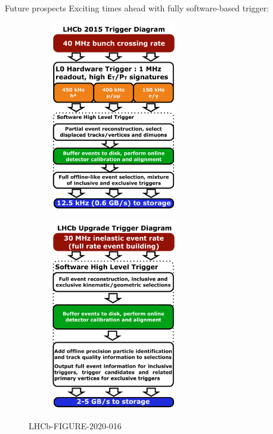 \documentclass[dvipsnames]{beamer}
\begin{document}
\begin{frame}{Future prospects}
  \vspace{0.3cm}
  {\Large Exciting times ahead with fully software-based trigger:}
  \begin{figure}[htb]
    \centering
    \begin{subfigure}{0.5\textwidth}
      \centering
      \includegraphics[width=0.6\textwidth]{Plots/LHCb_Run2_Trigger.pdf}
    \end{subfigure}%
    \begin{subfigure}{0.5\textwidth}
      \centering
      \includegraphics[width=0.6\textwidth]{Plots/LHCb_Run3_Trigger.pdf}
    \end{subfigure}
    \caption*{\tiny LHCb-FIGURE-2020-016}
  \end{figure}
\end{frame}
\end{document}
